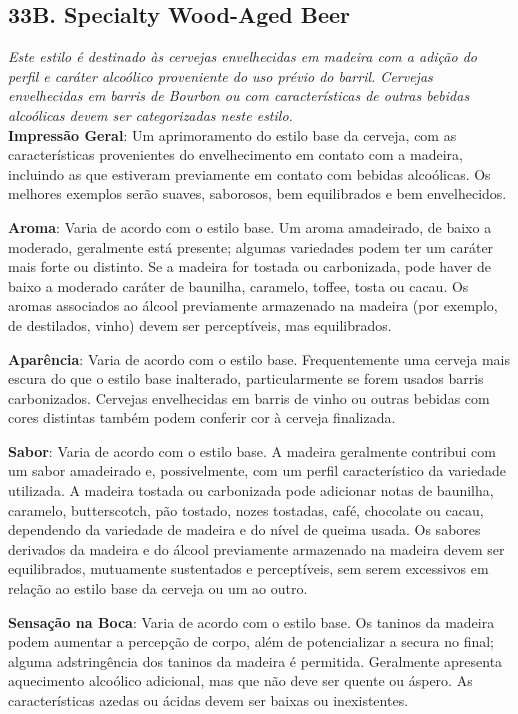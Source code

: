 \subsection*{33B. Specialty Wood-Aged Beer}
\textit{Este estilo é destinado às cervejas envelhecidas em madeira com a adição do perfil e caráter alcoólico proveniente do uso prévio do barril. Cervejas envelhecidas em barris de Bourbon ou com características de outras bebidas alcoólicas devem ser categorizadas neste estilo.}\\
\textbf{Impressão Geral}: Um aprimoramento do estilo base da cerveja, com as características provenientes do envelhecimento em contato com a madeira, incluindo as que estiveram previamente em contato com bebidas alcoólicas. Os melhores exemplos serão suaves, saborosos, bem equilibrados e bem envelhecidos.

\textbf{Aroma}: Varia de acordo com o estilo base. Um aroma amadeirado, de baixo a moderado, geralmente está presente; algumas variedades podem ter um caráter mais forte ou distinto. Se a madeira for tostada ou carbonizada, pode haver de baixo a moderado caráter de baunilha, caramelo, toffee, tosta ou cacau. Os aromas associados ao álcool previamente armazenado na madeira (por exemplo, de destilados, vinho) devem ser perceptíveis, mas equilibrados.

\textbf{Aparência}: Varia de acordo com o estilo base. Frequentemente uma cerveja mais escura do que o estilo base inalterado, particularmente se forem usados barris carbonizados. Cervejas envelhecidas em barris de vinho ou outras bebidas com cores distintas também podem conferir cor à cerveja finalizada.

\textbf{Sabor}: Varia de acordo com o estilo base. A madeira geralmente contribui com um sabor amadeirado e, possivelmente, com um perfil característico da variedade utilizada. A madeira tostada ou carbonizada pode adicionar notas de baunilha, caramelo, butterscotch, pão tostado, nozes tostadas, café, chocolate ou cacau, dependendo da variedade de madeira e do nível de queima usada. Os sabores derivados da madeira e do álcool previamente armazenado na madeira devem ser equilibrados, mutuamente sustentados e perceptíveis, sem serem excessivos em relação ao estilo base da cerveja ou um ao outro.

\textbf{Sensação na Boca}: Varia de acordo com o estilo base. Os taninos da madeira podem aumentar a percepção de corpo, além de potencializar a secura no final; alguma adstringência dos taninos da madeira é permitida. Geralmente apresenta aquecimento alcoólico adicional, mas que não deve ser quente ou áspero. As características azedas ou ácidas devem ser baixas ou inexistentes.

